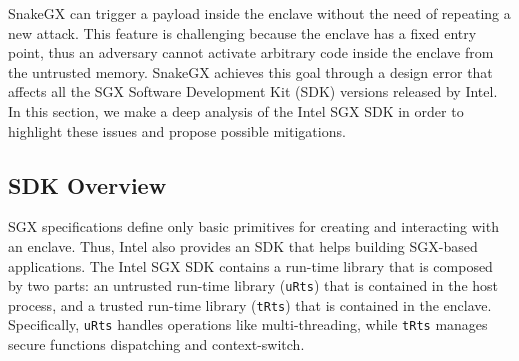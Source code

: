 
SnakeGX can trigger a payload inside the enclave without the need of repeating 
a new attack.
This feature is challenging because the enclave has a fixed 
entry point, thus an adversary cannot activate arbitrary code inside the 
enclave from the untrusted memory.
SnakeGX achieves this goal through a design error that affects all 
the SGX Software Development Kit (SDK) versions released by Intel.
In this section, we make a deep analysis of the Intel SGX SDK in order to 
highlight these issues and propose possible mitigations.

\subsection{SDK Overview}
\label{ssec:sdk-overview}

SGX specifications define only basic primitives for creating and interacting 
with an enclave.
Thus, Intel also provides an SDK that helps building SGX-based applications.
The Intel SGX SDK contains a run-time library that is composed by two parts: an 
untrusted run-time library (\texttt{uRts}) that is contained in the host 
process, and a trusted run-time library (\texttt{tRts}) that is contained in 
the enclave.
Specifically, \texttt{uRts} handles operations like multi-threading, while 
\texttt{tRts} manages secure functions dispatching and context-switch. 

